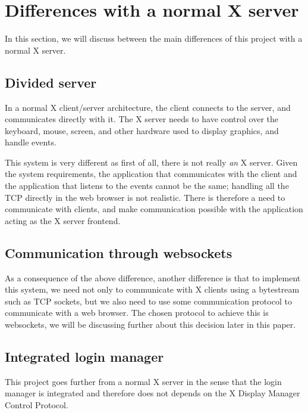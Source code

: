 \section{Differences with a normal X server}
In this section, we will discuss between the main differences of this project 
with a normal X server.
\subsection{Divided server}
In a normal X client/server architecture, the client connects to the server, 
and communicates directly with it. The X server needs to have control over the 
keyboard, mouse, screen, and other hardware used to display graphics, and handle events.

This system is very different as first of all, there is not really \emph{an} X server.
Given the system requirements, the application that communicates with the client and the 
application that listens to the events cannot be the same; handling all the TCP 
directly in the web browser is not realistic. There is therefore a need 
to communicate with clients, and make communication possible with the application 
acting as the X server frontend.
%
\subsection{Communication through websockets}
As a consequence of the above difference, another difference is that to 
implement this system, we need not only to communicate with X clients using 
a bytestream such as TCP sockets, but we also need to use some communication protocol to 
communicate with a web browser. The chosen protocol to achieve this is 
websockets, we will be discussing further about this decision later in 
this paper.
%
\subsection{Integrated login manager}
This project goes further from a normal X server in the sense that the 
login manager is integrated and therefore does not depends on the 
X Display Manager Control Protocol.